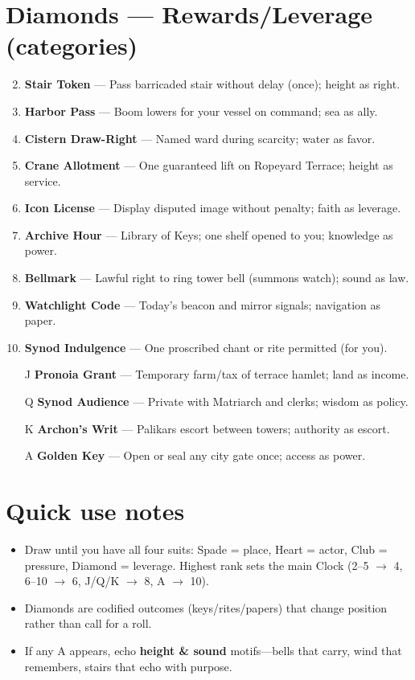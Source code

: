 \section*{Diamonds --- Rewards/Leverage (categories)}
\label{sec:thepyrgos-rewards}
\begin{enumerate}
\setcounter{enumi}{1}
\item \textbf{Stair Token} --- Pass barricaded stair without delay (once); height as right.
\item \textbf{Harbor Pass} --- Boom lowers for your vessel on command; sea as ally.
\item \textbf{Cistern Draw-Right} --- Named ward during scarcity; water as favor.
\item \textbf{Crane Allotment} --- One guaranteed lift on Ropeyard Terrace; height as service.
\item \textbf{Icon License} --- Display disputed image without penalty; faith as leverage.
\item \textbf{Archive Hour} --- Library of Keys; one shelf opened to you; knowledge as power.
\item \textbf{Bellmark} --- Lawful right to ring tower bell (summons watch); sound as law.
\item \textbf{Watchlight Code} --- Today's beacon and mirror signals; navigation as paper.
\item \textbf{Synod Indulgence} --- One proscribed chant or rite permitted (for you).
\item[J] \textbf{Pronoia Grant} --- Temporary farm/tax of terrace hamlet; land as income.
\item[Q] \textbf{Synod Audience} --- Private with Matriarch and clerks; wisdom as policy.
\item[K] \textbf{Archon's Writ} --- Palikars escort between towers; authority as escort.
\item[A] \textbf{Golden Key} --- Open or seal any city gate once; access as power.
\end{enumerate}

\section*{Quick use notes}
\label{sec:thepyrgos-quick-use}
\begin{itemize}
\item Draw until you have all four suits: Spade = place, Heart = actor, Club = pressure, Diamond = leverage. Highest rank sets the main Clock (2--5 $\rightarrow$ 4, 6--10 $\rightarrow$ 6, J/Q/K $\rightarrow$ 8, A $\rightarrow$ 10).
\item Diamonds are codified outcomes (keys/rites/papers) that change position rather than call for a roll.
\item If any A appears, echo \textbf{height \& sound} motifs---bells that carry, wind that remembers, stairs that echo with purpose.
\end{itemize}

